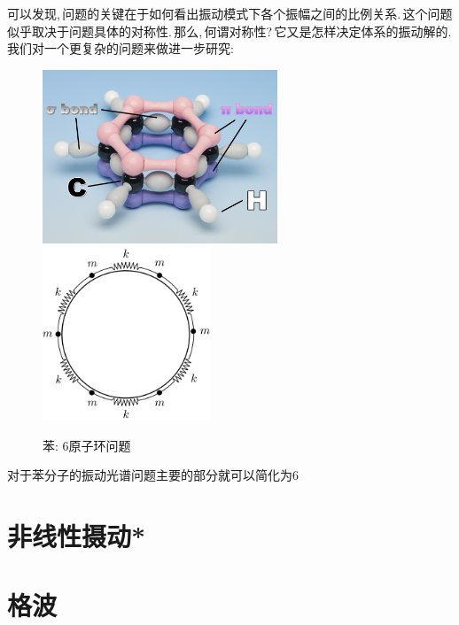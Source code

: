 可以发现,\,问题的关键在于如何看出振动模式下各个振幅之间的比例关系.\,这个问题似乎取决于问题具体的对称性.\,那么,\,何谓对称性?\,它又是怎样决定体系的振动解的.\,我们对一个更复杂的问题来做进一步研究:

\begin{figure}[H]
\centering
\includegraphics[width=7cm]{image/6-3-10.png}
\hspace{2cm}
\includegraphics[width=5cm]{image/6-3-8.png}
\caption{苯: 6原子环问题}
\end{figure}

对于苯分子的振动光谱问题主要的部分就可以简化为$6$




\section{非线性摄动*}

\section{格波}



